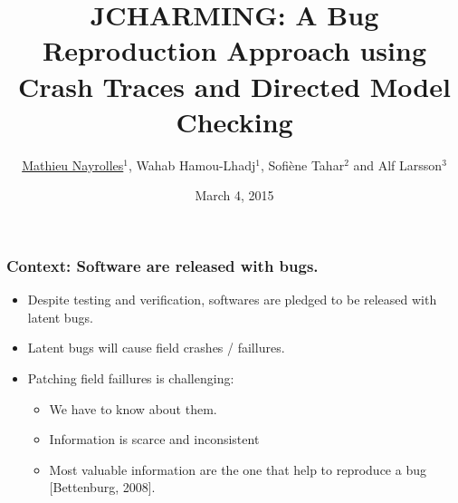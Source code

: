 \documentclass{beamer}
\title[JCHARMING]{JCHARMING: A Bug Reproduction Approach using Crash Traces and Directed Model Checking} %
\author[Mathieu Nayrolles]{\underline{Mathieu Nayrolles$^1$}, Wahab Hamou-Lhadj$^1$, Sofi\`ene Tahar$^2$ and Alf Larsson$^3$} %
\institute[Concordia] %
{
$^1$Software Behaviour Analysis (SBA) Research Lab, ECE,  Concordia, Montr\'eal, Canada\\
$^2$Hardware Verification Group (HVG) Research Lab, ECE, Concordia, Montr\'eal, Canada \\ 
$^3$PLF System Management, R\&D Ericsson, Stockholm, Sweden \\ 
\medskip
\textit{mathieu.nayrolles@gmail.com, wahab.hamou-lhadj@concordia.ca, tahar@ece.concordia.ca, alf.larsson@ericsson.com} %
}
\date{March 4, 2015} %
\begin{document}
\begin{frame}
\titlepage %
\end{frame}


\begin{frame}
\frametitle{Context: Software are released with bugs.}

\begin{itemize}
\item Despite testing and verification, softwares are pledged to be released with latent bugs.
\vspace{0.3cm}
\item Latent bugs will cause field crashes / faillures.
\vspace{0.3cm}
\item Patching field faillures is challenging:
\begin{itemize}
\vspace{0.3cm}
\item We have to know about them.
\vspace{0.3cm}
\item Information is scarce and inconsistent
\vspace{0.3cm}
\item Most valuable information are the one that help to reproduce a bug [Bettenburg, 2008].
\end{itemize}
\end{itemize}
\end{frame}
\end{document}
